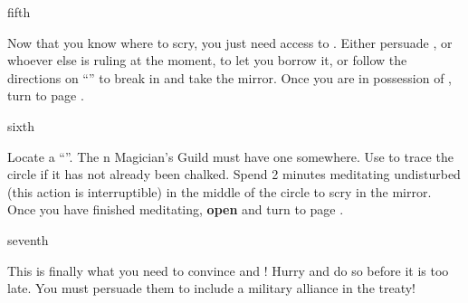 \documentclass[greennotebook]{NeptuneBall}
\begin{document}
\begin{page}{fifth}

Now that you know where to scry, you just need access to \iScryingMirror{}. Either persuade \cKing{\King} \cKing{}, or whoever else is ruling \pAtlantis{} at the moment, to let you borrow it, or follow the directions on ``\sArtifactThree{}'' to break in and take the mirror. Once you are in possession of \iScryingMirror{}, turn to page .

\end{page}

\begin{page}{sixth}

Locate a ``\sRunicCircle{}''. The \pAltantis{}n Magician's Guild must have one somewhere. Use \iChalk{} to trace the circle if it has not already been chalked. Spend 2 minutes meditating undisturbed (this action is interruptible) in the middle of the circle to scry in the mirror. Once you have finished meditating, {\bf open \iScryingMirror{}} and turn to page .

\end{page}

\begin{page}{seventh}

This is finally what you need to convince \cKing{} and \cPrince{}! Hurry and do so before it is too late. You must persuade them to include a military alliance in the treaty!

\end{page}


\endnotebook
\end{document}
